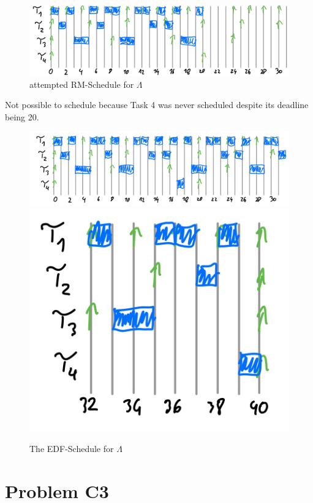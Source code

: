 \documentclass[12pt]{article}
\begin{document}
\begin{itemize}
		\begin{figure}[h]
		\centering
		\includegraphics[scale = 0.2]{figures/c2_3}
		\caption{attempted RM-Schedule for $\Lambda$}
		\end{figure}
        Not possible to schedule because Task 4 was never scheduled despite its deadline being 20.

		\begin{figure}[h]
		\centering
		\includegraphics[scale = 0.15]{figures/c2_4}
		\includegraphics[scale = 0.15]{figures/c2_5}
		\caption{The EDF-Schedule for $\Lambda$}
		\end{figure}
\end{itemize}

\section*{Problem C3}
\end{document}
